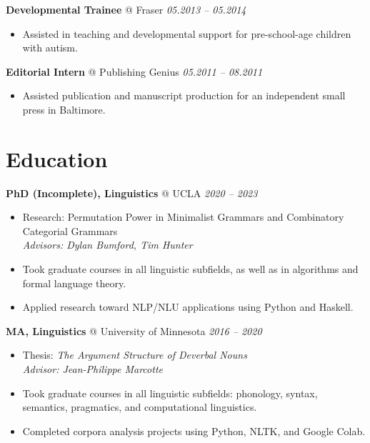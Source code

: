 \documentclass[10pt,letterpaper]{article}
\begin{document}
\vspace{0.4em}
\noindent\textbf{Developmental Trainee} @ Fraser \hfill \textit{05.2013 -- 05.2014}
\begin{itemize}[leftmargin=1.3em, itemsep=1.5pt, parsep=0pt, topsep=2pt]
    \item Assisted in teaching and developmental support for pre-school-age children with autism.
\end{itemize}

\vspace{0.4em}
\noindent\textbf{Editorial Intern} @ Publishing Genius \hfill \textit{05.2011 -- 08.2011}
\begin{itemize}[leftmargin=1.3em, itemsep=1.5pt, parsep=0pt, topsep=2pt]
    \item Assisted publication and manuscript production for an independent small press in Baltimore.
\end{itemize}

\vspace{0.4em}
\section*{Education}

\noindent\textbf{PhD (Incomplete), Linguistics} @ UCLA \hfill \textit{2020 -- 2023}
\begin{itemize}[leftmargin=1.3em, itemsep=1.5pt, parsep=0pt, topsep=2pt]
    \item Research: Permutation Power in Minimalist Grammars and Combinatory Categorial Grammars\\
    \textit{Advisors: Dylan Bumford, Tim Hunter}
    \item Took graduate courses in all linguistic subfields, as well as in algorithms and formal language theory.
    \item Applied research toward NLP/NLU applications using Python and Haskell.
\end{itemize}

\vspace{0.4em}
\noindent\textbf{MA, Linguistics} @ University of Minnesota \hfill \textit{2016 -- 2020}
\begin{itemize}[leftmargin=1.3em, itemsep=1.5pt, parsep=0pt, topsep=2pt]
    \item Thesis: \textit{The Argument Structure of Deverbal Nouns}\\
    \textit{Advisor: Jean-Philippe Marcotte}
    \item Took graduate courses in all linguistic subfields: phonology, syntax, semantics, pragmatics, and computational linguistics.
    \item Completed corpora analysis projects using Python, NLTK, and Google Colab.
\end{itemize}
\end{document}
